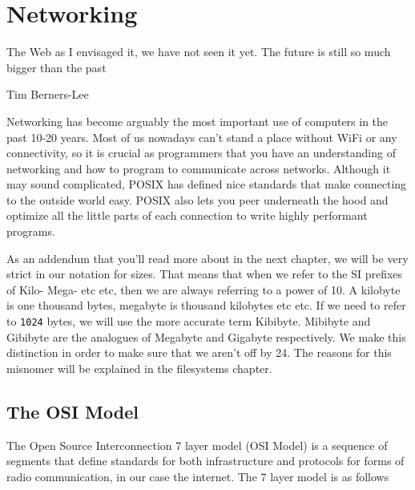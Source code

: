 \chapter{Networking}

\epigraph{The Web as I envisaged it, we have not seen it yet.
  The future is still so much bigger than the past}{Tim Berners-Lee}

Networking has become arguably the most important use of computers in the past 10-20 years.
Most of us nowadays can't stand a place without WiFi or any connectivity, so it is crucial as programmers that you have an understanding of networking and how to program to communicate across networks.
Although it may sound complicated, POSIX has defined nice standards that make connecting to the outside world easy.
POSIX also lets you peer underneath the hood and optimize all the little parts of each connection to write highly performant programs.

As an addendum that you'll read more about in the next chapter, we will be very strict in our notation for sizes.
That means that when we refer to the SI prefixes of Kilo- Mega- etc etc, then we are always referring to a power of 10.
A kilobyte is one thousand bytes, megabyte is thousand kilobytes etc etc.
If we need to refer to \texttt{1024} bytes, we will use the more accurate term Kibibyte. Mibibyte and Gibibyte are the analogues of Megabyte and Gigabyte respectively.
We make this distinction in order to make sure that we aren't off by 24.
The reasons for this misnomer will be explained in the filesystems chapter.

\section{The OSI Model}

The Open Source Interconnection 7 layer model (OSI Model) is a sequence of segments that define standards for both infrastructure and protocols for forms of radio communication, in our case the internet.
The 7 layer model is as follows

